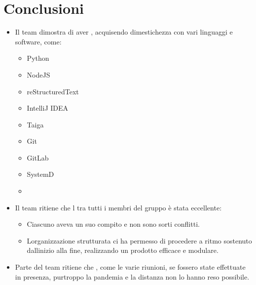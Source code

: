 \documentclass[letterpaper,10pt,italian]{sphinxmanual}
\begin{document}
\chapter{Conclusioni}
\label{\detokenize{development/conclusions:conclusioni}}\label{\detokenize{development/conclusions::doc}}\begin{itemize}
\item {} 
\sphinxAtStartPar
Il team dimostra di aver , acquisendo dimestichezza con vari linguaggi e software,
come:
\begin{itemize}
\item {} 
\sphinxAtStartPar
Python

\item {} 
\sphinxAtStartPar
NodeJS

\item {} 
\sphinxAtStartPar
reStructuredText

\item {} 
\sphinxAtStartPar
IntelliJ IDEA

\item {} 
\sphinxAtStartPar
Taiga

\item {} 
\sphinxAtStartPar
Git

\item {} 
\sphinxAtStartPar
GitLab

\item {} 
\sphinxAtStartPar
SystemD

\item {} 
\sphinxAtStartPar
{}

\end{itemize}

\item {} 
\sphinxAtStartPar
Il team ritiene che l\textquotesingle{} tra tutti i membri del gruppo è stata eccellente:
\begin{itemize}
\item {} 
\sphinxAtStartPar
Ciascuno aveva un suo compito e non sono sorti conflitti.

\item {} 
\sphinxAtStartPar
L\textquotesingle{}organizzazione strutturata ci ha permesso di procedere a ritmo sostenuto dall\textquotesingle{}inizio alla fine,
realizzando un prodotto efficace e modulare.

\end{itemize}

\item {} 
\sphinxAtStartPar
Parte del team ritiene che , come le varie riunioni,  se
fossero state effettuate in presenza, purtroppo la pandemia e la distanza non lo hanno reso possibile.


\end{itemize}
\end{document}
